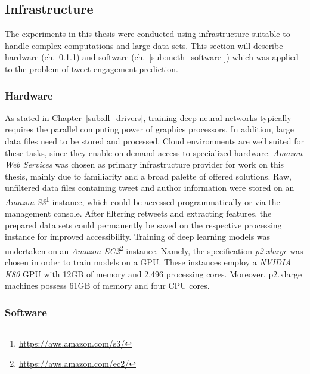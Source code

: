 \subsection{Infrastructure}
\label{sec:infrastructure}

The experiments in this thesis were conducted using infrastructure suitable
to handle complex computations and large data sets.
This section will describe hardware (ch.~\ref{sub:meth_hardware}) and software
(ch.~\ref{sub:meth_software }) which was applied to the problem of tweet
engagement prediction.

\subsubsection{Hardware}
\label{sub:meth_hardware}

As stated in Chapter~\ref{sub:dl_drivers}, training deep neural networks
typically requires the parallel computing power of graphics processors.
In addition, large data files need to be stored and processed.
Cloud environments are well suited for these tasks, since they enable on-demand 
access to specialized hardware.
\textit{Amazon Web Services} was chosen as primary infrastructure provider for 
work on this thesis, mainly due to familiarity and a broad palette of offered
solutions.
Raw, unfiltered data files containing tweet and author information were stored
on an \textit{Amazon S3}\footnote{\url{https://aws.amazon.com/s3/}} instance,
which could be accessed programmatically or via the management console.
After filtering retweets and extracting features, the prepared data sets could
permanently be saved on the respective processing instance for improved
accessibility.
Training of deep learning models was undertaken on an \textit{Amazon EC2}\footnote{\url{https://aws.amazon.com/ec2/}}
instance.
Namely, the specification \textit{p2.xlarge} was chosen in order to train models
on a GPU.
These instances employ a \textit{NVIDIA K80} GPU with 12GB of memory and 2,496
processing cores.
Moreover, p2.xlarge machines possess 61GB of memory and four CPU cores.

\subsubsection{Software}
\label{sub:meth_software}

